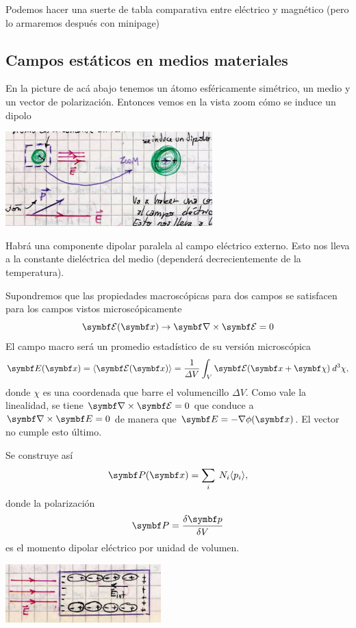 \documentclass[10pt,oneside]{CBFT_book}
\begin{document}
Podemos hacer una suerte de tabla comparativa entre eléctrico y magnético
(pero lo armaremos después con minipage)

\subsection{Campos estáticos en medios materiales}


En la picture de acá abajo tenemos un átomo esféricamente simétrico, un medio y un vector
de polarización. Entonces vemos en la vista zoom cómo se induce un dipolo

\includegraphics[width=0.6\textwidth]{images/fig_ft1_medios_campos_estaticos.jpg}

Habrá una componente dipolar paralela al campo eléctrico externo.
Esto nos lleva a la constante dieléctrica del medio (dependerá decrecientemente 
de la temperatura).

Supondremos que las propiedades macroscópicas para dos campos se satisfacen para los
campos vistos microscópicamente
\[
	\vb{\mathcal{E}}(\vbx) \to \rotorm{\mathcal{E}} = 0
\]
El campo macro  será un promedio estadístico de su versión microscópica
\[
	\vb{E}(\vbx) = \langle \vb{\mathcal{E}}(\vbx)  \rangle =
	\frac{1}{\Delta V} \int_V \vb{\mathcal{E}}( \vbx + \vb{\chi} ) \: d^3\chi,
\]
donde $\chi$ es una coordenada que barre el volumencillo $\Delta V$.
Como vale la linealidad, se tiene $ \rotorm{\mathcal{E}} = 0 $ que conduce a
$ \rotorm{ E } = 0 $ de manera que $ \vb{E} = - \nabla \phi(\vbx) $.
El vector  no cumple esto último.

Se construye así
\[
	\vb{P}(\vbx) = \sum_i \: N_i \langle p_i \rangle,
\]
donde la polarización  
\[
	\vb{P} = \frac{\delta \vb{p}}{\delta V}
\]
es el momento dipolar eléctrico por unidad de volumen. 

\includegraphics[width=0.45\textwidth]{images/fig_ft1_medios_picturete.jpg}	
\end{document}
